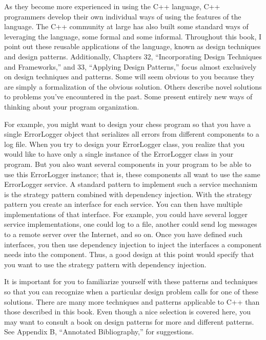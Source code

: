 As they become more experienced in using the C++ language, C++ programmers develop their own individual ways of using the features of the language. The C++ community at large has also built some standard ways of leveraging the language, some formal and some informal. Throughout this book, I point out these reusable applications of the language, known as design techniques and design patterns. Additionally, Chapters 32, “Incorporating Design Techniques and Frameworks,” and 33, “Applying Design Patterns,” focus almost exclusively on design techniques and patterns. Some will seem obvious to you because they are simply a formalization of the obvious solution. Others describe novel solutions to problems you’ve encountered in the past. Some present entirely new ways of thinking about your program organization.

For example, you might want to design your chess program so that you have a single ErrorLogger object that serializes all errors from different components to a log file. When you try to design your ErrorLogger class, you realize that you would like to have only a single instance of the ErrorLogger class in your program. But you also want several components in your program to be able to use this ErrorLogger instance; that is, these components all want to use the same ErrorLogger service. A standard pattern to implement such a service mechanism is the strategy pattern combined with dependency injection. With the strategy pattern you create an interface for each service. You can then have multiple implementations of that interface. For example, you could have several logger service implementations, one could log to a file, another could send log messages to a remote server over the Internet, and so on. Once you have defined such interfaces, you then use dependency injection to inject the interfaces a component needs into the component. Thus, a good design at this point would specify that you want to use the strategy pattern with dependency injection.

It is important for you to familiarize yourself with these patterns and techniques so that you can recognize when a particular design problem calls for one of these solutions. There are many more techniques and patterns applicable to C++ than those described in this book. Even though a nice selection is covered here, you may want to consult a book on design patterns for more and different patterns.
See Appendix B, “Annotated Bibliography,” for suggestions.



















